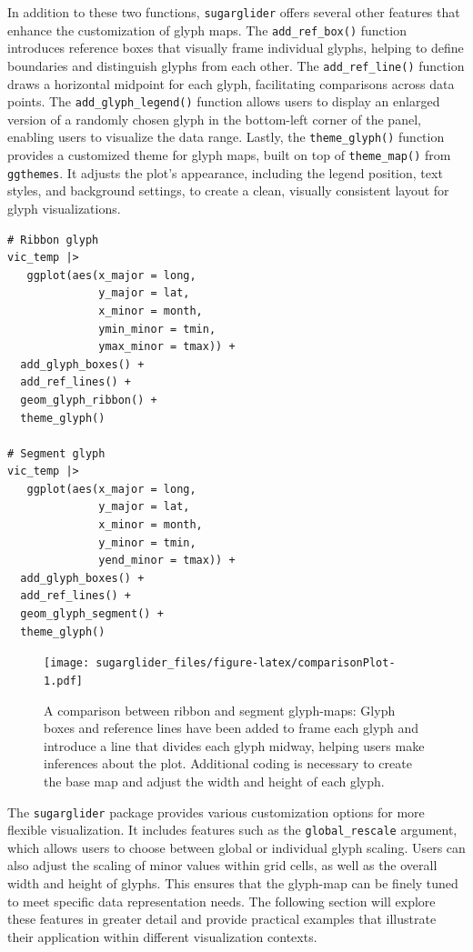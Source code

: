 In addition to these two functions, \texttt{sugarglider} offers several other features that enhance the customization of glyph maps. The \texttt{add\_ref\_box()} function introduces reference boxes that visually frame individual glyphs, helping to define boundaries and distinguish glyphs from each other. The \texttt{add\_ref\_line()} function draws a horizontal midpoint for each glyph, facilitating comparisons across data points. The \texttt{add\_glyph\_legend()} function allows users to display an enlarged version of a randomly chosen glyph in the bottom-left corner of the panel, enabling users to visualize the data range. Lastly, the \texttt{theme\_glyph()} function provides a customized theme for glyph maps, built on top of \texttt{theme\_map()} from \texttt{ggthemes}. It adjusts the plot's appearance, including the legend position, text styles, and background settings, to create a clean, visually consistent layout for glyph visualizations.

\begin{verbatim}
# Ribbon glyph
vic_temp |>
   ggplot(aes(x_major = long,
              y_major = lat,
              x_minor = month,
              ymin_minor = tmin,
              ymax_minor = tmax)) +
  add_glyph_boxes() +
  add_ref_lines() +
  geom_glyph_ribbon() +
  theme_glyph()

# Segment glyph
vic_temp |>
   ggplot(aes(x_major = long,
              y_major = lat,
              x_minor = month,
              y_minor = tmin,
              yend_minor = tmax)) +
  add_glyph_boxes() +
  add_ref_lines() +
  geom_glyph_segment() +
  theme_glyph()
\end{verbatim}

\begin{figure}
\centering
\texttt{[image: sugarglider\_files/figure-latex/comparisonPlot-1.pdf]}
\caption{\label{fig:comparisonPlot}A comparison between ribbon and segment glyph-maps: Glyph boxes and reference lines have been added to frame each glyph and introduce a line that divides each glyph midway, helping users make inferences about the plot. Additional coding is necessary to create the base map and adjust the width and height of each glyph.}
\end{figure}

The \texttt{sugarglider} package provides various customization options for more flexible visualization. It includes features such as the \texttt{global\_rescale} argument, which allows users to choose between global or individual glyph scaling. Users can also adjust the scaling of minor values within grid cells, as well as the overall width and height of glyphs. This ensures that the glyph-map can be finely tuned to meet specific data representation needs. The following section will explore these features in greater detail and provide practical examples that illustrate their application within different visualization contexts.

